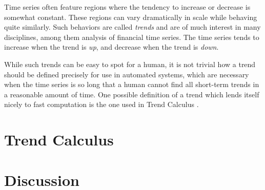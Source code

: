 \documentclass[../main.tex]{subfiles}
\begin{document}
  Time series often feature regions where the tendency to 
  increase or decrease is somewhat constant.
  These regions can vary dramatically in scale while behaving quite similarly.
  Such behaviors are called \textit{trends} and are of much interest in many disciplines, 
  among them analysis of financial time series.
  The time series tends to increase when the trend is \textit{up}, 
  and decrease when the trend is \textit{down}.

  While such trends can be easy to spot for a human, 
  it is not trivial how a trend should be defined precisely for use in automated systems,
  which are necessary when the time series is so long that a human cannot find
  all short-term trends in a reasonable amount of time.
  One possible definition of a trend which lends itself nicely to 
  fast computation is the one used in Trend Calculus \cite{trendcalculus,morgan-amend-mastering-spark}.

  \section{Trend Calculus}
    

  \section{Discussion}
    
\end{document}
